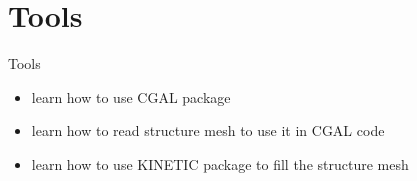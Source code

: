 \documentclass[10pt]{beamer}
\begin{document}
\section{Tools}

\begin{frame}[plain]{Tools}
    \begin{itemize}
        \item learn how to use CGAL package
        \item learn how to read structure mesh to use it in CGAL code
        \item learn how to use KINETIC package to fill the structure mesh  
    \end{itemize}
\end{frame}
\begin{frame}
    
\end{frame}
\end{document}
